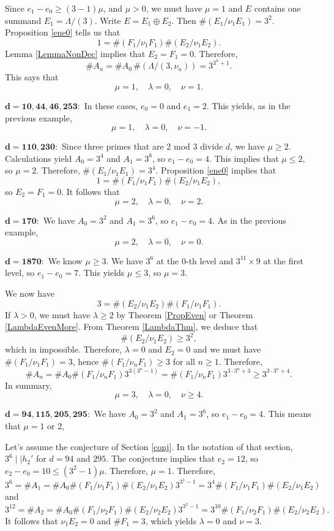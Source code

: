 \documentclass{amsart}
\begin{document}
 Since $e_1-e_0\ge (3-1)\mu$, and $\mu>0$, we must have $\mu=1$
and $E$ contains one summand $E_1=\Lambda/(3)$. Write $E=E_1\oplus E_2$.
Then $\#(E_1/\nu_1E_1)=3^2$.
Proposition \ref{ene0} tells us that
\begin{equation*}\label{d22F}
 1=\#(F_1/\nu_1F_1) \#(E_2/\nu_1E_2).
\end{equation*}
Lemma \ref{LemmaNonDec} implies that $E_2=F_1=0$.
Therefore, 
$$
\#A_n = \#A_0\, \#(\Lambda/(3,\nu_n)) = 3^{3^n + 1}.
$$
This says that
$$
\mu=1, \quad \lambda = 0, \quad \nu=1.
$$
\medskip

\noindent
$\mathbf{d=10, 44, 46, 253:}$ In these cases, $e_0=0$ and $e_1=2$. This yields, as in the previous example, 
$$
\mu=1, \quad \lambda=0, \quad \nu=-1.
$$

\medskip
\noindent
$\mathbf{d=110, 230:}$
Since three primes that are 2 mod 3 divide $d$, we have $\mu \ge 2$. Calculations yield $A_0=3^4$ and $A_1=3^8$, so $e_1-e_0 = 4$. This implies that
$\mu\le 2$, so $\mu = 2$. Therefore, $\#(E_1/\nu_1E_1)=3^4$. Proposition \ref{ene0} implies that
$$
1=\#(F_1/\nu_1F_1)\#(E_2/\nu_1E_2),
$$
so $E_2=F_1=0$. 
It follows that
$$
\mu=2, \quad  \lambda = 0, \quad \nu=2.
$$
\medskip

\noindent
$\mathbf{d=170:}$ We have $A_0= 3^2$ and $A_1=3^6$, so $e_1-e_0=4$. As in the previous example, 
$$
\mu=2, \quad  \lambda = 0, \quad \nu=0.
$$

\medskip

\noindent
{$\mathbf{d=1870:}$} 
We know $\mu \ge 3$. We have $3^6$ at the 0-th level and $3^{11} \times 9$ at the first level, so $e_1-e_0=7$.
This yields $\mu\le 3$, so $\mu=3$. 

We now have
$$
3=\#(E_2/\nu_1E_2) \#(F_1/\nu_1F_1).
$$
If $\lambda >0$, we must have $\lambda\ge 2$ by Theorem \ref{PropEven} or Theorem \ref{LambdaEvenMore}. From Theorem \ref{LambdaThm},
we deduce that
$$
\#(E_2/\nu_1E_2) \ge 3^2,
$$
which in impossible. Therefore, $\lambda = 0$ and $E_2=0$ and
we must have $\#(F_1/\nu_1F_1)= 3$, hence $\#(F_1/\nu_nF_1)\ge 3$ for all $n\ge 1$.
Therefore,
$$
\#A_n=\#A_0 \#(F_1/\nu_n F_1) 3^{3 (3^n-1)}= \#(F_1/\nu_n F_1) 3^{3\cdot 3^n +3}\ge 3^{3\cdot 3^n +4}.
$$
In summary,
$$
\mu=3, \quad \lambda  = 0, \quad \nu\ge 4.
$$

\medskip
\noindent
$\mathbf{d=94, 115, 205, 295:}$ 
We have $A_0=3^2$ and $A_1=3^6$, so $e_1-e_0 = 4$. This means that $\mu = 1$ or $2$, 

Let's assume the conjecture of Section \ref{conj}. In the notation of that section, $3^6\mid\mid h_2'$ for
$d=94$ and $295$. The conjecture implies that $e_2=12$, so $e_2-e_0=10 \le (3^2-1)\mu$. Therefore, $\mu=1$.
Therefore,
$$
3^{6} = \#A_1=\#A_0 \#(F_1/\nu_1 F_1) \#(E_2/\nu_1E_2) 3^{3^1-1}=3^{4} \#(F_1/\nu_1 F_1) \#(E_2/\nu_1 E_2)
$$
and 
$$
3^{12} = \#A_2=\#A_0 \#(F_1/\nu_2 F_1) \#(E_2/\nu_2E_2) 3^{3^2-1}=3^{10} \#(F_1/\nu_2 F_1) \#(E_2/\nu_2 E_2).
$$
It follows that $\nu_1E_2=0$ and $\#F_1=3$, which yields $\lambda=0$ and $\nu=3$.
\end{document}
